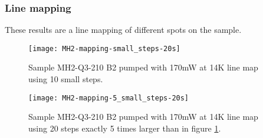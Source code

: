 \subsubsection{Line mapping}

These results are a line mapping of different spots on the sample.

\begin{figure}[H]
\centering
\texttt{[image: MH2-mapping-small\_steps-20s]}
\caption[MH2-Q3-210 line mapping]{Sample MH2-Q3-210 B2 pumped with 170mW at 14K line map using 10 small steps.}
\label{fig:MH2-mapping-small_steps-20s}%
\end{figure}

\begin{figure}[H]
\centering
\texttt{[image: MH2-mapping-5\_small\_steps-20s]}
\caption[MH2-Q3-210 line mapping]{Sample MH2-Q3-210 B2 pumped with 170mW at 14K line map using 20 steps exactly 5 times larger than in figure \ref{fig:MH2-mapping-small_steps-20s}.}
\label{fig:MH2-mapping-5_small_steps-20s}%
\end{figure}
